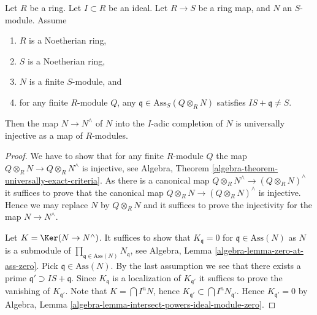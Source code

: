 \begin{lemma}
\label{lemma-universally-injective-to-completion}
Let $R$ be a ring.
Let $I \subset R$ be an ideal.
Let $R \to S$ be a ring map, and $N$ an $S$-module.
Assume
\begin{enumerate}
\item $R$ is a Noetherian ring,
\item $S$ is a Noetherian ring,
\item $N$ is a finite $S$-module, and
\item for any finite $R$-module $Q$, any
$\mathfrak q \in \text{Ass}_S(Q \otimes_R N)$
satisfies $IS + \mathfrak q \not = S$.
\end{enumerate}
Then the map $N \to N^\wedge$ of $N$ into the $I$-adic completion of $N$
is universally injective as a map of $R$-modules.
\end{lemma}

\begin{proof}
We have to show that for any finite $R$-module $Q$ the map
$Q \otimes_R N \to Q \otimes_R N^\wedge$ is injective, see
Algebra, Theorem \ref{algebra-theorem-universally-exact-criteria}.
As there is a canonical map $Q \otimes_R N^\wedge \to (Q \otimes_R N)^\wedge$
it suffices to prove that the canonical map
$Q \otimes_R N \to (Q \otimes_R N)^\wedge$ is injective.
Hence we may replace $N$ by $Q \otimes_R N$ and it suffices to prove the
injectivity for the map $N \to N^\wedge$.

\medskip\noindent
Let $K = \Ker(N \to N^\wedge)$. It suffices to show that
$K_{\mathfrak q} = 0$ for $\mathfrak q \in \text{Ass}(N)$ as $N$ is a
submodule of $\prod_{\mathfrak q \in \text{Ass}(N)} N_{\mathfrak q}$, see
Algebra, Lemma \ref{algebra-lemma-zero-at-ass-zero}.
Pick $\mathfrak q \in \text{Ass}(N)$. By the last assumption we see that
there exists a prime $\mathfrak q' \supset IS + \mathfrak q$.
Since $K_{\mathfrak q}$ is a localization of $K_{\mathfrak q'}$
it suffices to prove the vanishing of $K_{\mathfrak q'}$.
Note that $K = \bigcap I^nN$, hence
$K_{\mathfrak q'} \subset \bigcap I^nN_{\mathfrak q'}$.
Hence $K_{\mathfrak q'} = 0$ by
Algebra, Lemma \ref{algebra-lemma-intersect-powers-ideal-module-zero}.
\end{proof}
